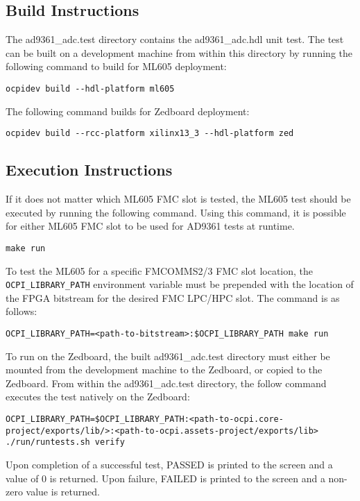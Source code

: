\documentclass{article}
\def\comp{ad9361\_adc}
\begin{document}
\subsection*{Build Instructions}
The \comp{}.test directory contains the \comp{}.hdl unit test. The test can be built on a development machine from within this directory by running the following command to build for ML605 deployment:
\lstset{language=bash, columns=flexible, breaklines=true, prebreak=\textbackslash, basicstyle=\ttfamily, showstringspaces=false,upquote=true, aboveskip=\baselineskip, belowskip=\baselineskip}
\begin{lstlisting}
ocpidev build --hdl-platform ml605
\end{lstlisting}
The following command builds for Zedboard deployment:
\begin{lstlisting}
ocpidev build --rcc-platform xilinx13_3 --hdl-platform zed
\end{lstlisting}
\subsection*{Execution Instructions}
If it does not matter which ML605 FMC slot is tested, the ML605 test should be executed by running the following command. Using this command, it is possible for either ML605 FMC slot to be used for AD9361 tests at runtime.
\begin{lstlisting}
make run
\end{lstlisting}
To test the ML605 for a specific FMCOMMS2/3 FMC slot location, the \texttt{OCPI\_LIBRARY\_PATH} environment variable must be prepended with the location of the FPGA bitstream for the desired FMC LPC/HPC slot. The command is as follows:
\begin{lstlisting}
OCPI_LIBRARY_PATH=<path-to-bitstream>:$OCPI_LIBRARY_PATH make run
\end{lstlisting}
To run on the Zedboard, the built \comp{}.test directory must either be mounted from the development machine to the Zedboard, or copied to the Zedboard. From within the \comp{}.test directory, the follow command executes the test natively on the Zedboard:
\begin{lstlisting}
OCPI_LIBRARY_PATH=$OCPI_LIBRARY_PATH:<path-to-ocpi.core-project/exports/lib/>:<path-to-ocpi.assets-project/exports/lib> ./run/runtests.sh verify
\end{lstlisting}
Upon completion of a successful test, PASSED is printed to the screen and a value of 0 is returned. Upon failure, FAILED is printed to the screen and a non-zero value is returned.
\end{document}
